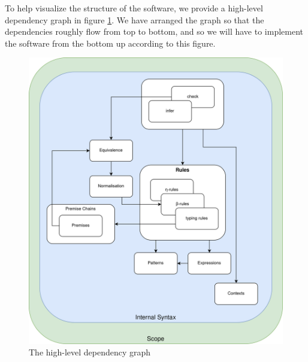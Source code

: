 To help visualize the structure of the software, we provide a
high-level dependency graph in figure \ref{fig:dep}. We have arranged
the graph so that the dependencies roughly flow from top to bottom,
and so we will have to implement the software from the bottom up
according to this figure.

\begin{figure}
  \label{fig:dep}
  \caption{The high-level dependency graph}
\centering
\includegraphics[width=\textwidth]{pictures/dependency-graph}
\end{figure}
\clearpage

















